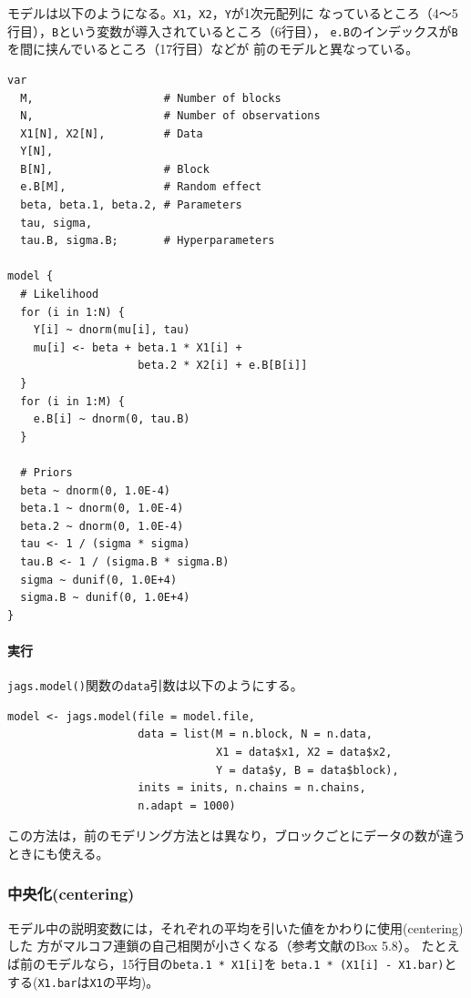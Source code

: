 \documentclass[11pt,uplatex]{jsarticle}
\begin{document}
モデルは以下のようになる。\texttt{X1}，\texttt{X2}，\texttt{Y}が1次元配列に
なっているところ（4〜5行目），\texttt{B}という変数が導入されているところ（6行目），
\texttt{e.B}のインデックスが\texttt{B}を間に挟んでいるところ（17行目）などが
前のモデルと異なっている。

\begin{lstlisting}
var
  M,                    # Number of blocks
  N,                    # Number of observations
  X1[N], X2[N],         # Data
  Y[N],
  B[N],                 # Block
  e.B[M],               # Random effect
  beta, beta.1, beta.2, # Parameters
  tau, sigma,
  tau.B, sigma.B;       # Hyperparameters

model {
  # Likelihood
  for (i in 1:N) {
    Y[i] ~ dnorm(mu[i], tau)
    mu[i] <- beta + beta.1 * X1[i] +
                    beta.2 * X2[i] + e.B[B[i]]
  }
  for (i in 1:M) {
    e.B[i] ~ dnorm(0, tau.B)
  }

  # Priors
  beta ~ dnorm(0, 1.0E-4)
  beta.1 ~ dnorm(0, 1.0E-4)
  beta.2 ~ dnorm(0, 1.0E-4)
  tau <- 1 / (sigma * sigma)
  tau.B <- 1 / (sigma.B * sigma.B)
  sigma ~ dunif(0, 1.0E+4)
  sigma.B ~ dunif(0, 1.0E+4)
}
\end{lstlisting}

\paragraph{実行}

\texttt{jags.model()}関数の\texttt{data}引数は以下のようにする。
\begin{lstlisting}
model <- jags.model(file = model.file,
                    data = list(M = n.block, N = n.data,
                                X1 = data$x1, X2 = data$x2,
                                Y = data$y, B = data$block),
                    inits = inits, n.chains = n.chains,
                    n.adapt = 1000)
\end{lstlisting}

この方法は，前のモデリング方法とは異なり，ブロックごとにデータの数が違うときにも使える。

\subsubsection*{中央化(centering)}

モデル中の説明変数には，それぞれの平均を引いた値をかわりに使用(centering)した
方がマルコフ連鎖の自己相関が小さくなる（参考文献\cite{McCarthy}のBox 5.8）。
たとえば前のモデルなら，15行目の\texttt{beta.1 * X1[i]}を
\texttt{beta.1 * (X1[i] - X1.bar)}とする(\texttt{X1.bar}は\texttt{X1}の平均)。
\end{document}
